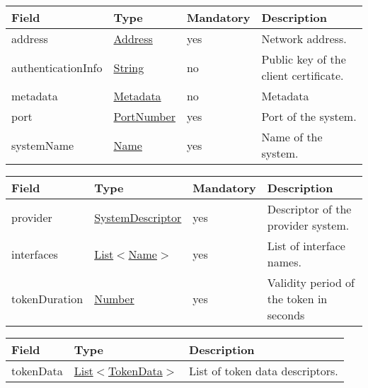 \documentclass[a4paper]{arrowhead}
\newcommand{\pref}[1]{{\textcolor{ArrowheadGrey}{\hyperref[sec:model:primitives:#1]{#1}}}}
\begin{document}
\label{sec:model:SystemDescriptor}

\begin{table}[ht!]
\begin{tabularx}{\textwidth}{| p{3cm} | p{3cm} | p{2cm} | X |} \hline
\rowcolor{gray!33} Field & Type & Mandatory & Description \\ \hline
address & \pref{Address} & yes & Network address. \\ \hline
authenticationInfo & \pref{String} & no & Public key of the client certificate. \\ \hline
metadata & \hyperref[sec:model:Metadata]{Metadata} & no & Metadata \\ \hline
port & \pref{PortNumber} & yes & Port of the system. \\ \hline
systemName &\pref{Name} & yes & Name of the system. \\ \hline
\end{tabularx}
\end{table}

\clearpage

\label{sec:model:TokenGenerationDescriptor}

\begin{table}[ht!]
\begin{tabularx}{\textwidth}{| p{3cm} | p{6cm} | p{2cm} | X |} \hline
\rowcolor{gray!33} Field & Type & Mandatory & Description \\ \hline
provider & \hyperref[sec:model:SystemDescriptor]{SystemDescriptor} & yes & Descriptor of the provider system. \\ \hline
interfaces & \pref{List}$<$\pref{Name}$>$ & yes & List of interface names. \\ \hline
tokenDuration &  \pref{Number} & yes & Validity period of the token in seconds \\ \hline
\end{tabularx}
\end{table}

\label{sec:model:TokenGenerationResponse}
 
\begin{table}[ht!]
\begin{tabularx}{\textwidth}{| p{4.25cm} | p{3.5cm} | X |} \hline
\rowcolor{gray!33} Field & Type      & Description \\ \hline
tokenData & \pref{List}$<$\hyperref[sec:model:TokenData]{TokenData}$>$ & List of token data descriptors. \\ \hline
\end{tabularx}
\end{table}
\end{document}
